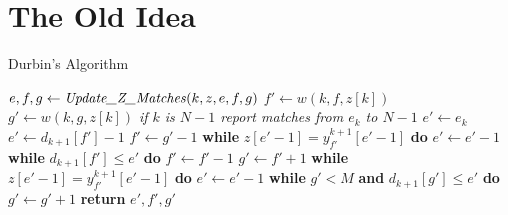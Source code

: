 \documentclass{beamer}
\begin{document}
\section{The Old Idea}
\begin{frame}{Durbin's Algorithm}
  \begin{algorithm}[H]
    \scriptsize
    \begin{algorithmic}
      \State $e,f,g\gets \mbox{\textit{Update\_Z\_Matches}}(k, z, e, f, g)$
      \EndFor
      \EndFunction
      \State $f'\gets w(k, f, z[k])$
      \State $g'\gets w(k, g, z[k])$
      \Comment\textit{{if $k$ is $N-1$ report matches from $e_k$ to $N-1$}}
      \State $e'\gets e_k$
      \Else
      \State $e'\gets d_{k+1}[f']-1$
      \State $f'\gets g'-1$
      \State \textbf{while} $z[e'-1]=y_{f'}^{k+1}[e'-1]$ \textbf{do} $e'\gets
      e'-1$
      \State \textbf{while} $d_{k+1}[f']\leq e'$ \textbf{do} $f'\gets f'-1$
      \Else
      \State $g'\gets f'+1$
      \State \textbf{while} $z[e'-1]=y_{f'}^{k+1}[e'-1]$ \textbf{do}  $e'\gets
      e'-1$ 
      \State \textbf{while} $g'<M$ \textbf{and} $d_{k+1}[g']\leq e'$ \textbf{do}
      $g'\gets g'+1$ 
      \EndIf
      \EndIf
      \State \textbf{return} $e',f',g'$
      \EndFunction
    \end{algorithmic}
    \caption{Algorithm 5 from Durbin's paper}
  \end{algorithm}
\end{frame}
\end{document}
